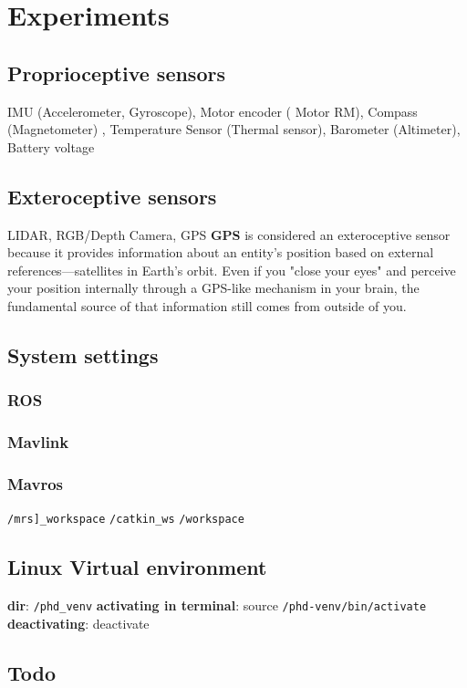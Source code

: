 \chapter{Experiments}



\section{Proprioceptive sensors} IMU (Accelerometer, Gyroscope), Motor encoder (	Motor RM), Compass (Magnetometer) , Temperature Sensor (Thermal sensor), Barometer (Altimeter), Battery voltage

\section{Exteroceptive sensors} LIDAR, RGB/Depth Camera, GPS
    \textbf{GPS} is considered an exteroceptive sensor because it provides information about an entity’s position based on external references—satellites in Earth's orbit. Even if you "close your eyes" and perceive your position internally through a GPS-like mechanism in your brain, the fundamental source of that information still comes from outside of you.


\section{System settings}
    \subsection{ROS}
    \subsection{Mavlink}
    \subsection{Mavros}
        \texttt{/mrs]\_workspace}
        \texttt{/catkin\_ws}
        \texttt{/workspace}

\section{Linux Virtual environment}
    \textbf{dir}: \texttt{/phd\_venv}
    \textbf{activating in terminal}: source \texttt{/phd-venv/bin/activate}
    \textbf{deactivating}: deactivate


\section{Todo}
